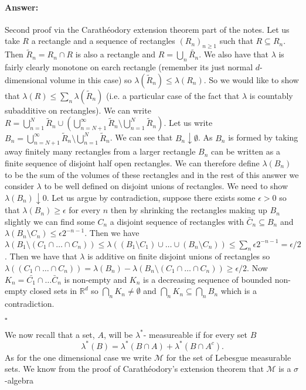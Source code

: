 \documentclass[11pt]{article}
\theoremstyle{definition}
\theoremstyle{remark}
\newenvironment{ans}{\paragraph{Answer:}}{\hfill$\square$}
\begin{document}
\begin{ans}
Second proof via the Carath\'eodory extension theorem part of the notes. Let us take $R$ a rectangle and a sequence of rectangles $(R_n)_{n \geq 1}$ such that $R \subseteq R_n$. Then $\tilde{R}_n = R_n \cap R$ is also a rectangle and $R= \bigcup_n \tilde{R_n}$. We also have that $\lambda$ is fairly clearly monotone on earch rectangle (remember its just normal $d$-dimensional volume in this case) so $\lambda(\tilde{R}_n) \leq \lambda(R_n)$. So we would like to show that $\lambda(R) \leq \sum_n \lambda( \tilde{R}_n)$ (i.e. a particular case of the fact that $\lambda$ is countably subadditive on rectangles). We can write $R = \bigcup_{n=1}^N \tilde{R}_n \cup \left( \bigcup_{n=N+1}^\infty \tilde{R}_n \setminus \bigcup_{n=1}^N \tilde{R}_n \right)$. Let us write $B_n = \bigcup_{n=N+1}^\infty \tilde{R}_n \setminus \bigcup_{n=1}^N \tilde{R}_n $. We can see that $B_n \downarrow \emptyset$. As $B_n$ is formed by taking away finitely many rectangles from a larger rectangle $B_n$ can be written as a finite sequence of disjoint half open rectangles. We can therefore define $\lambda(B_n)$ to be the sum of the volumes of these rectangles and in the rest of this answer we consider $\lambda$ to be well defined on disjoint unions of rectangles. We need to show $\lambda(B_n) \downarrow 0$. Let us argue by contradiction, suppose there exists some $\epsilon >0$ so that $\lambda(B_n) \geq \epsilon$ for every $n$ then by shrinking the rectangles making up $B_n$ slightly we can find some $C_n$ a disjoint sequence of rectangles with $\bar{C}_n \subseteq B_n$ and $\lambda(B_n \setminus C_n) \leq \epsilon 2^{-n-1}$. Then we have $\lambda(B_1 \setminus (C_1 \cap \dots \cap C_n)) \leq \lambda((B_1 \setminus C_1) \cup \dots \cup (B_n \setminus C_n)) \leq \sum_n \epsilon 2^{-n-1} = \epsilon /2$. Then we have that $\lambda$ is additive on finite disjoint unions of rectangles so $\lambda((C_1 \cap \dots \cap C_n)) = \lambda(B_n) - \lambda(B_n \setminus (C_1 \cap \dots \cap C_n)) \geq \epsilon/2$. Now $K_n = \bar{C_1} \cap \dots \bar{C}_n$ is non-empty and $K_n$ is a decreasing sequence of bounded non-empty closed sets in $\mathbb{R}^d$ so $\bigcap_n K_n \neq \emptyset$ and $\bigcap_n K_n \subseteq \bigcap_n B_n$ which is a contradiction.

\end{ans}

We now recall that a set, $A$, will be $\lambda^*$- measureable if for every set $B$
\[ \lambda^*(B) = \lambda^*(B \cap A) + \lambda^*(B \cap A^c). \] As for the one dimensional case we write $\mathcal{M}$ for the set of Lebesgue measurable sets. We know from the proof of Carath\'eodory's extension theorem that $\mathcal{M}$ is a $\sigma$-algebra
\end{document}
